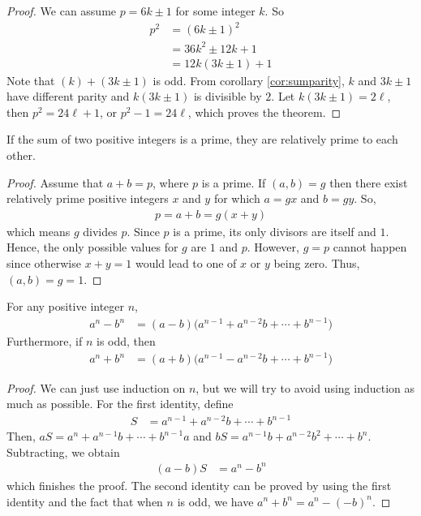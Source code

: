 \begin{proof}
	We can assume $p=6k\pm1$ for some integer $k$. So
	\begin{align*}
		p^2
			& = (6k\pm1)^2\\
			& = 36k^2\pm12k+1\\
			& = 12k(3k\pm1)+1
	\end{align*}
	Note that $(k)+(3k\pm1)$ is odd. From corollary \eqref{cor:sumparity}, $k$ and $3k\pm1$ have different parity and $k(3k\pm1)$ is divisible by $2$. Let $k(3k\pm1)=2\ell$, then $p^2=24\ell+1$, or $p^2-1=24\ell$, which proves the theorem.
\end{proof}

\begin{theorem}
	If the sum of two positive integers is a prime, they are relatively prime to each other.
\end{theorem}

\begin{proof}
	Assume that $a+b=p$, where $p$ is a prime. If $(a,b)=g$ then there exist relatively prime positive integers $x$ and $y$ for which $a=gx$ and $b=gy$. So,
	\begin{align*}
		p = a+b = g(x+y)
	\end{align*}
	which means $g$ divides $p$. Since $p$ is a prime, its only divisors are itself and $1$. Hence, the only possible values for $g$ are $1$ and $p$. However, $g=p$ cannot happen since otherwise $x+y=1$ would lead to one of $x$ or $y$ being zero. Thus, $(a,b)=g=1$.
\end{proof}


\begin{theorem}\label{id:fatandthin}
	For any positive integer $n$,
	\begin{align*}
		a^n-b^n
			& =(a-b)\Big(a^{n-1}+a^{n-2}b+\cdots+b^{n-1}\Big)
	\end{align*}
	Furthermore, if $n$ is odd, then
	\begin{align*}
		a^n+b^n
			& =(a+b)\Big(a^{n-1}-a^{n-2}b+\cdots+b^{n-1}\Big)
	\end{align*}
	\label{thm:powDiv}
\end{theorem}
\begin{proof}
	We can just use induction on $n$, but we will try to avoid using induction as much as possible. For the first identity, define
	\begin{align*}
		S & =a^{n-1}+a^{n-2}b+\cdots+b^{n-1}
	\end{align*}
	Then, $aS=a^n+a^{n-1}b+\cdots+b^{n-1}a$ and $bS=a^{n-1}b+a^{n-2}b^2+\cdots+b^n$. Subtracting, we obtain
	\begin{align*}
		(a-b)S & =a^n-b^n
	\end{align*}
	which finishes the proof. The second identity can be proved by using the first identity and the fact that when $n$ is odd, we have $a^n+b^n=a^n-(-b)^n$.
\end{proof}

